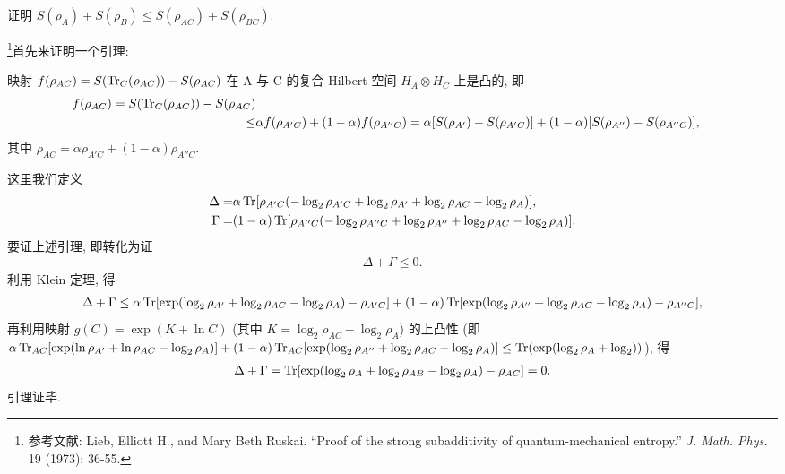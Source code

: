 \documentclass{assignment}
\begin{document}
\begin{probcontinued}{10}
    证明 $S(\rho_A)+S(\rho_B)\leq S(\rho_{AC})+S(\rho_{BC})$.
\end{probcontinued}
\begin{pf}
    \footnote{参考文献: Lieb, Elliott H., and Mary Beth Ruskai. ``Proof of the strong subadditivity of quantum-mechanical entropy.'' \textit{J. Math. Phys.} 19 (1973): 36-55.}首先来证明一个引理:
    \begin{framed}
        映射 $f(\rho_{AC})=S(\operatorname{Tr}_C(\rho_{AC}))-S(\rho_{AC})$ 在 A 与 C 的复合 Hilbert 空间 $H_A\otimes H_C$ 上是凸的, 即
        \begin{align}
            \notag f(\rho_{AC})=S(\operatorname{Tr}_C(\rho_{AC}))-S(\rho_{AC})\\
            \leq&\alpha f(\rho_{A'C})+(1-\alpha)f(\rho_{A''C})=\alpha[S(\rho_{A'})-S(\rho_{A'C})]+(1-\alpha)[S(\rho_{A''})-S(\rho_{A''C})],
        \end{align}
        其中 $\rho_{AC}=\alpha\rho_{A'C}+(1-\alpha)\rho_{A''C}$.
    \end{framed}
    这里我们定义
    \begin{align}
        \Delta=&\alpha\operatorname{Tr}[\rho_{A'C}(-\log_2\rho_{A'C}+\log_2\rho_{A'}+\log_2\rho_{AC}-\log_2\rho_A)],\\
        \Gamma=&(1-\alpha)\operatorname{Tr}[\rho_{A''C}(-\log_2\rho_{A''C}+\log_2\rho_{A''}+\log_2\rho_{AC}-\log_2\rho_A)].
    \end{align}
    要证上述引理, 即转化为证
    \begin{align}
        \Delta+\Gamma\leq 0.
    \end{align}
    利用 Klein 定理,
    得
    \begin{align}
        \Delta+\Gamma\leq\alpha\operatorname{Tr}[\exp(\log_2\rho_{A'}+\log_2\rho_{AC}-\log_2\rho_A)-\rho_{A'C}]+(1-\alpha)\operatorname{Tr}[\exp(\log_2\rho_{A''}+\log_2\rho_{AC}-\log_2\rho_A)-\rho_{A''C}],
    \end{align}
    再利用映射 $g(C)=\exp(K+\ln C)$ (其中 $K=\log_2\rho_{AC}-\log_2\rho_A$) 的上凸性 (即 $\alpha\operatorname{Tr}_{AC}[\exp(\ln\rho_{A'}+\ln\rho_{AC}-\log_2\rho_A)]+(1-\alpha)\operatorname{Tr}_{AC}[\exp(\log_2\rho_{A''}+\log_2\rho_{AC}-\log_2\rho_A)]\leq\operatorname{Tr}(\exp(\log_2\rho_A+\log_2))$), 得
    \begin{align}
        \Delta+\Gamma=\operatorname{Tr}[\exp(\log_2\rho_A+\log_2\rho_{AB}-\log_2\rho_A)-\rho_{AC}]=0.
    \end{align}
    引理证毕.


\end{pf}
\end{document}
